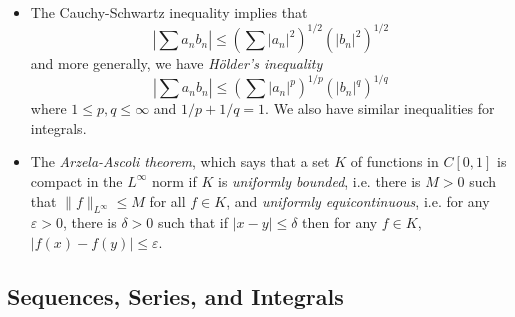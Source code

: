 \documentclass[answers]{exam}
\theoremstyle{problemstyle}
\newcommand{\1}[1]{\textbf{1}_{\left[#1\right]}} %
\begin{document}
\begin{itemize}
	\item The Cauchy-Schwartz inequality implies that
	\[ | \sum a_n b_n | \leq \left( \sum |a_n|^2 \right)^{1/2} \left( |b_n|^2 \right)^{1/2} \]
	and more generally, we have \emph{H\"{o}lder's inequality}
	\[ | \sum a_n b_n | \leq \left( \sum |a_n|^p \right)^{1/p} \left( |b_n|^q \right)^{1/q} \]
	where $1 \leq p,q \leq \infty$ and $1/p + 1/q = 1$. We also have similar inequalities for integrals.

	\item The \emph{Arzela-Ascoli theorem}, which says that a set $K$ of functions in $C[0,1]$ is compact in the $L^\infty$ norm if $K$ is \emph{uniformly bounded}, i.e. there is $M > 0$ such that $\| f \|_{L^\infty} \leq M$ for all $f \in K$, and \emph{uniformly equicontinuous}, i.e. for any $\varepsilon > 0$, there is $\delta > 0$ such that if $|x - y| \leq \delta$ then for any $f \in K$, $|f(x) - f(y)| \leq \varepsilon$.
\end{itemize}

\subsection*{Sequences, Series, and Integrals}
\end{document}
